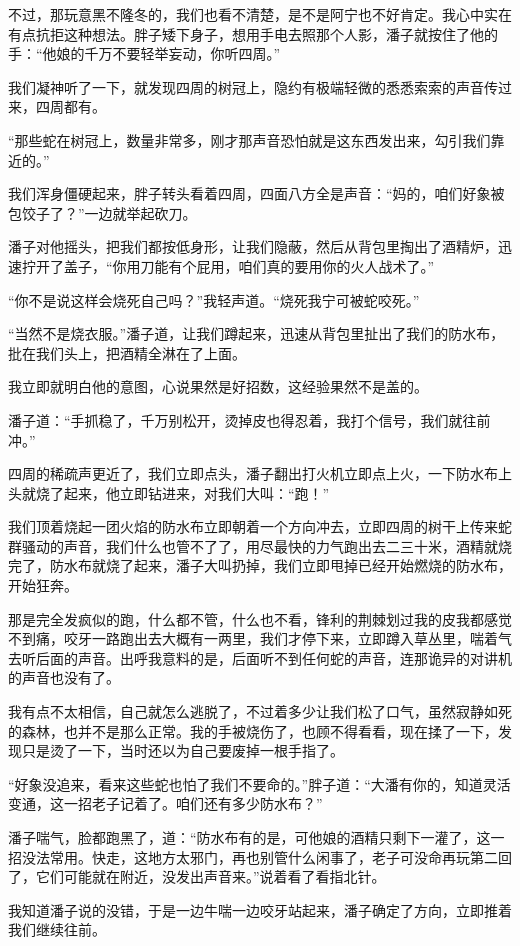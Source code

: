 不过，那玩意黑不隆冬的，我们也看不清楚，是不是阿宁也不好肯定。我心中实在有点抗拒这种想法。胖子矮下身子，想用手电去照那个人影，潘子就按住了他的手：“他娘的千万不要轻举妄动，你听四周。”

我们凝神听了一下，就发现四周的树冠上，隐约有极端轻微的悉悉索索的声音传过来，四周都有。

“那些蛇在树冠上，数量非常多，刚才那声音恐怕就是这东西发出来，勾引我们靠近的。”

我们浑身僵硬起来，胖子转头看着四周，四面八方全是声音：“妈的，咱们好象被包饺子了？”一边就举起砍刀。

潘子对他摇头，把我们都按低身形，让我们隐蔽，然后从背包里掏出了酒精炉，迅速拧开了盖子，“你用刀能有个屁用，咱们真的要用你的火人战术了。”

“你不是说这样会烧死自己吗？”我轻声道。“烧死我宁可被蛇咬死。”

“当然不是烧衣服。”潘子道，让我们蹲起来，迅速从背包里扯出了我们的防水布，批在我们头上，把酒精全淋在了上面。

我立即就明白他的意图，心说果然是好招数，这经验果然不是盖的。

潘子道：“手抓稳了，千万别松开，烫掉皮也得忍着，我打个信号，我们就往前冲。”

四周的稀疏声更近了，我们立即点头，潘子翻出打火机立即点上火，一下防水布上头就烧了起来，他立即钻进来，对我们大叫：“跑！”

我们顶着烧起一团火焰的防水布立即朝着一个方向冲去，立即四周的树干上传来蛇群骚动的声音，我们什么也管不了了，用尽最快的力气跑出去二三十米，酒精就烧完了，防水布就烧了起来，潘子大叫扔掉，我们立即甩掉已经开始燃烧的防水布，开始狂奔。

那是完全发疯似的跑，什么都不管，什么也不看，锋利的荆棘划过我的皮我都感觉不到痛，咬牙一路跑出去大概有一两里，我们才停下来，立即蹲入草丛里，喘着气去听后面的声音。出呼我意料的是，后面听不到任何蛇的声音，连那诡异的对讲机的声音也没有了。

我有点不太相信，自己就怎么逃脱了，不过着多少让我们松了口气，虽然寂静如死的森林，也并不是那么正常。我的手被烧伤了，也顾不得看看，现在揉了一下，发现只是烫了一下，当时还以为自己要废掉一根手指了。

“好象没追来，看来这些蛇也怕了我们不要命的。”胖子道：“大潘有你的，知道灵活变通，这一招老子记着了。咱们还有多少防水布？”

潘子喘气，脸都跑黑了，道：“防水布有的是，可他娘的酒精只剩下一灌了，这一招没法常用。快走，这地方太邪门，再也别管什么闲事了，老子可没命再玩第二回了，它们可能就在附近，没发出声音来。”说着看了看指北针。

我知道潘子说的没错，于是一边牛喘一边咬牙站起来，潘子确定了方向，立即推着我们继续往前。

